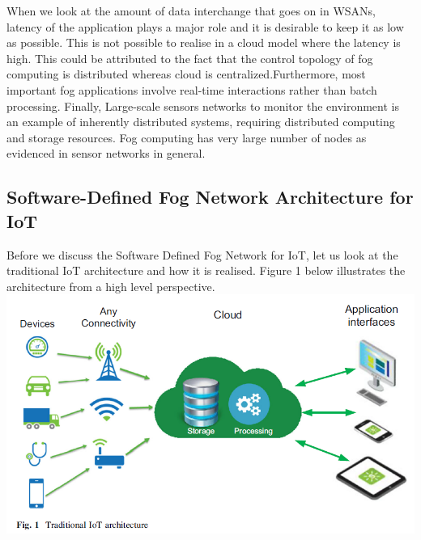 \documentclass{article}
\begin{document}
When we look at the amount of data interchange that goes on in WSANs, latency of the application plays a major role and it is desirable to keep it as low as possible. This is not possible to realise in a cloud model where the latency is high. This could be attributed to the fact that the control topology of fog computing is distributed whereas cloud is centralized\cite{lee2016gateway}.Furthermore, most important fog applications involve real-time interactions rather than batch processing\cite{lee2016gateway}. 
Finally, Large-scale sensors networks to monitor the environment is an example of inherently distributed systems, requiring distributed computing and storage resources. Fog computing has very large number of nodes as evidenced in sensor networks in general\cite{lee2016gateway}. 


\subsection{Software-Defined Fog Network Architecture for IoT}

Before we discuss the Software Defined Fog Network for IoT, let us look at the traditional IoT architecture and how it is realised.
Figure 1 below\cite{tomovic2017software} illustrates the architecture from a high level perspective. 
\includegraphics[scale=0.7]{iot.png}
\end{document}

